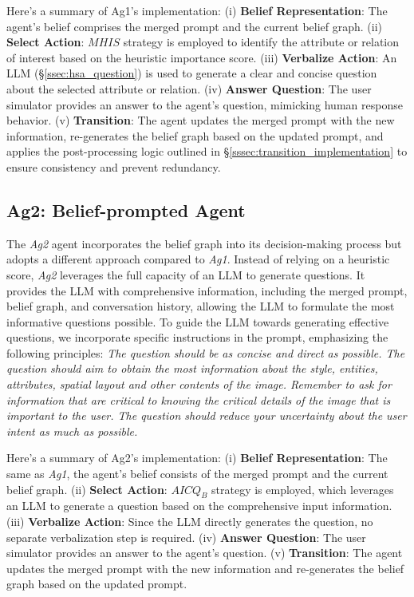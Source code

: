 Here's a summary of Ag1's implementation: (i) \textbf{Belief Representation}: The agent's belief comprises the merged prompt and the current belief graph. (ii) \textbf{Select Action}: $MHIS$ strategy is employed to identify the attribute or relation of interest based on the heuristic importance score. (iii) \textbf{Verbalize Action}: An LLM (\S\ref{ssec:hsa_question}) is used to generate a clear and concise question about the selected attribute or relation. (iv) \textbf{Answer Question}: The user simulator provides an answer to the agent's question, mimicking human response behavior. (v) \textbf{Transition}: The agent updates the merged prompt with the new information, re-generates the belief graph based on the updated prompt, and applies the post-processing logic outlined in \S\ref{sssec:transition_implementation} to ensure consistency and prevent redundancy.



\subsection{Ag2: Belief-prompted Agent}\label{ssec:ag2}
The \textit{Ag2} agent incorporates the belief graph into its decision-making process but adopts a different approach compared to \textit{Ag1}. Instead of relying on a heuristic score, \textit{Ag2} leverages the full capacity of an LLM to generate questions. It provides the LLM with comprehensive information, including the merged prompt, belief graph, and conversation history, allowing the LLM to formulate the most informative questions possible. To guide the LLM towards generating effective questions, we incorporate specific instructions in the prompt, emphasizing the following principles: \textit{The question should be as concise and direct as possible. The question should aim to obtain the most information about the style, entities, attributes, spatial layout and other contents of the image. Remember to ask for information that are critical to knowing the critical details of the image that is important to the user. The question should reduce your uncertainty about the user intent as much as possible.}

Here's a summary of Ag2's implementation: (i) \textbf{Belief Representation}: The same as \textit{Ag1}, the agent's belief consists of the merged prompt and the current belief graph. (ii) \textbf{Select Action}: $AICQ_{B}$ strategy is employed, which leverages an LLM to generate a question based on the comprehensive input information. (iii) \textbf{Verbalize Action}: Since the LLM directly generates the question, no separate verbalization step is required. (iv) \textbf{Answer Question}: The user simulator provides an answer to the agent's question. (v) \textbf{Transition}: The agent updates the merged prompt with the new information and re-generates the belief graph based on the updated prompt.


